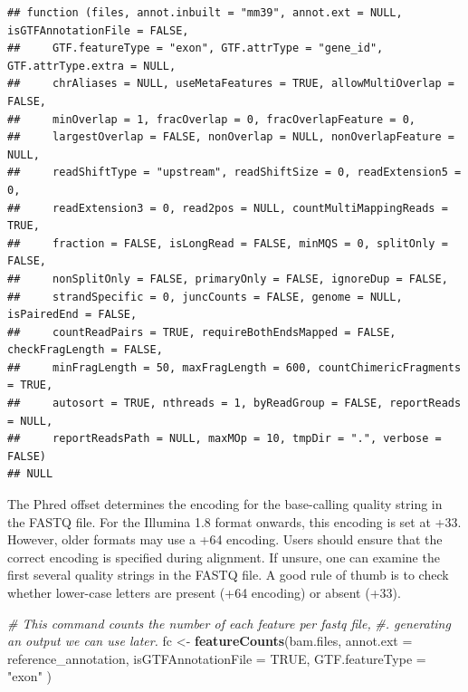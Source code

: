 \documentclass[
]{book}
\newenvironment{Shaded}{\begin{snugshade}}{\end{snugshade}}
\newcommand{\AttributeTok}[1]{\textcolor[rgb]{0.13,0.29,0.53}{#1}}
\newcommand{\CommentTok}[1]{\textcolor[rgb]{0.56,0.35,0.01}{\textit{#1}}}
\newcommand{\ConstantTok}[1]{\textcolor[rgb]{0.56,0.35,0.01}{#1}}
\newcommand{\FunctionTok}[1]{\textcolor[rgb]{0.13,0.29,0.53}{\textbf{#1}}}
\newcommand{\NormalTok}[1]{#1}
\newcommand{\OtherTok}[1]{\textcolor[rgb]{0.56,0.35,0.01}{#1}}
\newcommand{\StringTok}[1]{\textcolor[rgb]{0.31,0.60,0.02}{#1}}
\begin{document}
\begin{verbatim}
## function (files, annot.inbuilt = "mm39", annot.ext = NULL, isGTFAnnotationFile = FALSE, 
##     GTF.featureType = "exon", GTF.attrType = "gene_id", GTF.attrType.extra = NULL, 
##     chrAliases = NULL, useMetaFeatures = TRUE, allowMultiOverlap = FALSE, 
##     minOverlap = 1, fracOverlap = 0, fracOverlapFeature = 0, 
##     largestOverlap = FALSE, nonOverlap = NULL, nonOverlapFeature = NULL, 
##     readShiftType = "upstream", readShiftSize = 0, readExtension5 = 0, 
##     readExtension3 = 0, read2pos = NULL, countMultiMappingReads = TRUE, 
##     fraction = FALSE, isLongRead = FALSE, minMQS = 0, splitOnly = FALSE, 
##     nonSplitOnly = FALSE, primaryOnly = FALSE, ignoreDup = FALSE, 
##     strandSpecific = 0, juncCounts = FALSE, genome = NULL, isPairedEnd = FALSE, 
##     countReadPairs = TRUE, requireBothEndsMapped = FALSE, checkFragLength = FALSE, 
##     minFragLength = 50, maxFragLength = 600, countChimericFragments = TRUE, 
##     autosort = TRUE, nthreads = 1, byReadGroup = FALSE, reportReads = NULL, 
##     reportReadsPath = NULL, maxMOp = 10, tmpDir = ".", verbose = FALSE) 
## NULL
\end{verbatim}

The Phred offset determines the encoding for the base-calling quality string in the FASTQ file. For the Illumina 1.8 format onwards, this encoding is set at +33. However, older formats may use a +64 encoding. Users should ensure that the correct encoding is specified during alignment. If unsure, one can examine the first several quality strings in the FASTQ file. A good rule of thumb is to check whether lower-case letters are present (+64 encoding) or absent (+33).

\begin{Shaded}
\begin{Highlighting}[]
\CommentTok{\# This command counts the number of each feature per fastq file, }
\CommentTok{\#.  generating an output we can use later.}
\NormalTok{fc }\OtherTok{\textless{}{-}} \FunctionTok{featureCounts}\NormalTok{(bam.files,}
                    \AttributeTok{annot.ext =}\NormalTok{ reference\_annotation,}
                    \AttributeTok{isGTFAnnotationFile =} \ConstantTok{TRUE}\NormalTok{,}
                    \AttributeTok{GTF.featureType =} \StringTok{"exon"}
\NormalTok{                    )}
\end{Highlighting}
\end{Shaded}
\end{document}
